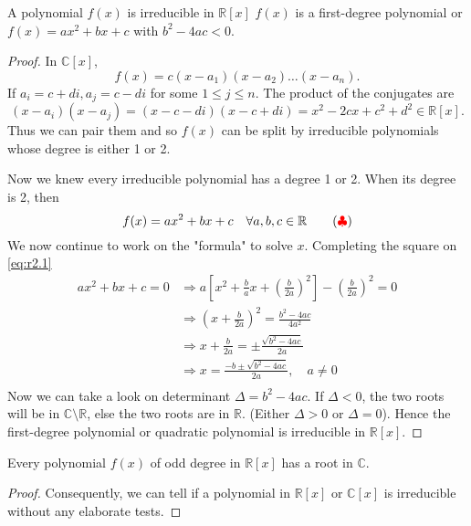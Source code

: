 \begin{theorem}
    A polynomial $f(x)$ is irreducible in $\mathbb{R}[x]$  $f(x)$ is a 
    first-degree polynomial or $f(x) = ax^2 + bx + c$ with $b^2 - 4ac < 0$.
\end{theorem}
\begin{proof}
    In $\mathbb{C}[x]$,
    \[
        f(x) = c(x - a_1)(x-a_2)\ldots (x-a_n).
    \]
    If $a_i = c + di, a_j = c-di$ for some $1 \leq j \leq n$. The product of the conjugates are 
    \[
        (x - a_i)(x - a_j) = (x - c -di)(x - c + di) = x^2 -2cx + c^2 + d^2 \in \mathbb{R}[x].
    \]
    Thus we can pair them and so $f(x)$ can be split by irreducible polynomials whose degree is either 
    1 or 2.

    Now we knew every irreducible polynomial has a degree 1 or 2. When its degree is 2, then 
    \[
        f(x) = ax^2 + bx + c \quad \forall a,b,c \in \mathbb{R} \label{eq:r2.1} \tag{{\color{red} $\clubsuit$}}
    \]
    We now continue to work on the "formula" to solve $x$. Completing the square on \eqref{eq:r2.1}
    \begin{align*}
        ax^2 + bx + c = 0 &\Rightarrow a \left[ x^2 + \frac{b}{a}x + \left(\frac{b}{2a} \right)^2 \right] - \left(\frac{b}{2a} \right)^2 = 0\\
        &\Rightarrow \left(x + \frac{b}{2a} \right)^2 = \frac{b^2 - 4ac}{4a^2}\\[0.35em]
        &\Rightarrow x + \frac{b}{2a} = \pm \frac{\sqrt{b^2 - 4ac}}{2a}\\[0.35em]
        &\Rightarrow x = \frac{-b \pm \sqrt{b^2 - 4ac}}{2a}, \quad a \neq 0\\
    \end{align*}
    Now we can take a look on determinant $\Delta = b^2 - 4ac$. If $\Delta < 0$, the two roots 
    will be in $\mathbb{C} \setminus \mathbb{R}$, else the two roots are in $\mathbb{R}$. (Either $\Delta > 0$ or 
    $\Delta = 0$). Hence the first-degree polynomial or quadratic polynomial is irreducible in $\mathbb{R}[x]$.
\end{proof}

\begin{corollary}
    Every polynomial $f(x)$ of odd degree in $\mathbb{R}[x]$ has a root in $\mathbb{C}$.
\end{corollary}
\begin{proof}
    Consequently, we can tell if a polynomial in $\mathbb{R}[x]$ or $\mathbb{C}[x]$ is irreducible without any elaborate 
    tests.
\end{proof}

